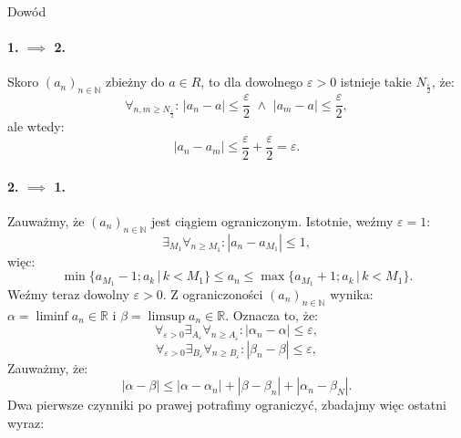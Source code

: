 \documentclass{article}
\numberwithin{defi}{section}
\numberwithin{theo}{section}
\numberwithin{defi}{section}
\newcommand{\R}{\mathbb{R}}
\newcommand{\N}{\mathbb{N}}
\newcommand{\eps}{\varepsilon}
\newcommand{\ciag}[1]{(#1_{n})_{n \in \N}}
\begin{document}
\begin{dow}{Dowód}
    \paragraph*{1. $\implies$ 2.} Skoro $\ciag{a}$ zbieżny do $a \in R$, to dla dowolnego $\eps >0$ istnieje takie $N_{\frac{\eps}{2}}$, że: \begin{equation}
        \forall_{n, m \geqslant N_{\frac{\eps}{2}}}: \,|a_n - a| \leqslant \frac{\eps}{2} \,\, \land\,\, |a_m - a| \leqslant \frac{\eps}{2},
    \end{equation}
    ale wtedy: \begin{equation}
        |a_n - a_m| \leqslant \frac{\eps}{2} + \frac{\eps}{2} = \eps.
    \end{equation}

    \paragraph*{2. $\implies$ 1.} Zauważmy, że $\ciag{a}$ jest ciągiem ograniczonym. Istotnie, weźmy $\eps = 1$: \begin{equation}
        \exists_{M_1} \forall_{n \geqslant M_1}: |a_n - a_{M_1}| \leqslant 1,
    \end{equation} więc: \begin{equation}
        \min \{ a_{M_1} -1; a_k \, \big| \, k < M_1 \} \leqslant a_n \leqslant \max \{ a_{M_1} +1; a_k \, \big| \, k < M_1 \}.
    \end{equation}
    Weźmy teraz dowolny $\eps > 0$. Z ograniczoności $\ciag{a}$ wynika: $\alpha = \liminf a_n \in \R$ i $\beta = \limsup a_n \in \R$. Oznacza to, że: \begin{equation}
        \forall_{\eps > 0} \exists_{A_\eps} \forall_{n \geqslant A_\eps}: |\alpha_n - \alpha| \leqslant \eps,
    \end{equation} \begin{equation}
        \forall_{\eps > 0} \exists_{B_\eps} \forall_{n \geqslant B_\eps}: |\beta_n - \beta| \leqslant \eps,
    \end{equation}
    Zauważmy, że: \begin{equation}
        |\alpha - \beta| \leqslant |\alpha - \alpha_n| + |\beta - \beta_n| + |\alpha_n - \beta_N|.
    \end{equation}
    Dwa pierwsze czynniki po prawej potrafimy ograniczyć, zbadajmy więc ostatni wyraz: \begin{equation} \begin{split}

\end{split}
\end{equation}
\end{dow}
\end{document}
